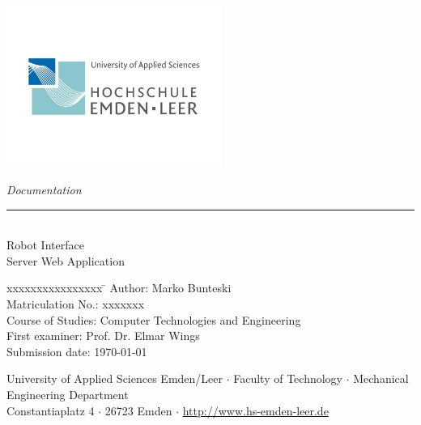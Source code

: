 %
%

\begin{titlepage}
    
    \begin{flushleft} 
        \includegraphics[width=7cm]{Images/1_HS_EmdenLeer.jpg}
    \end{flushleft} 
    
    \begin{flushright}
        \vspace{2cm}
        \LARGE \textsl{Documentation}\\
        \rule{0.6\textwidth}{0.4pt} ~\\
        \vspace{0.5cm}
        \textsf{\LARGE Robot Interface}\\
        \textsf{\LARGE Server Web Application}
    \end{flushright}
    
    \vspace{3cm}
    \large
    \begin{tabbing}
        xxxxxxxxxxxxxxxx \= \kill
        Author: \> Marko Bunteski \\
        Matriculation No.: \> xxxxxxx \\
        Course of Studies: \> Computer Technologies and Engineering \\ [0.5cm]
        First examiner: \> Prof. Dr. Elmar Wings \\
        Submission date: \> \today \\
    \end{tabbing}
    
    \vspace{3cm}
    \small
    \begin{center}
        University of Applied Sciences Emden/Leer $\cdot$ 
        Faculty of Technology $\cdot$ 
        Mechanical Engineering Department \\
        Constantiaplatz 4 $\cdot$ 
        26723 Emden $\cdot$ 
        \url{http://www.hs-emden-leer.de}
    \end{center}
    
\end{titlepage}

